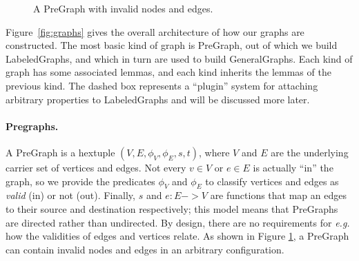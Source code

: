\begin{figure}[t]
\centering
{}
\endpgfgraphicnamed
\vspace{1ex}
\caption{A PreGraph with invalid nodes and edges.}\label{fig:pregraph}
\end{figure}

Figure~\ref{fig:graphs} gives the overall architecture of how our graphs are constructed.
The most basic kind of graph is PreGraph, out of which we build LabeledGraphs, and which in turn are used
to build GeneralGraphs.  Each kind of graph has some associated lemmas, and each kind inherits the lemmas of the previous kind.  The dashed box represents a ``plugin'' system for attaching arbitrary properties to LabeledGraphs and will be discussed more later. %

\paragraph{Pregraphs.} A PreGraph is a hextuple $(V, E, \phi_V, \phi_E, s, t)$,
where $V$ and $E$ are the underlying carrier set of vertices and edges.  Not every $v \in V$ or $e \in E$ is actually ``in'' the graph, so we provide the predicates $\phi_V$ and $\phi_E$ to classify vertices and edges as \emph{valid} (in) or not (out).  Finally, $s$ and $e : E -> V$ are functions that map an edges to their source and destination respectively; this model means that PreGraphs are directed rather than undirected.  By design, there are no requirements for \emph{e.g.} how the validities of edges and vertices relate.  As shown in Figure \ref{fig:pregraph}, a PreGraph can contain invalid nodes and edges in an arbitrary configuration.

